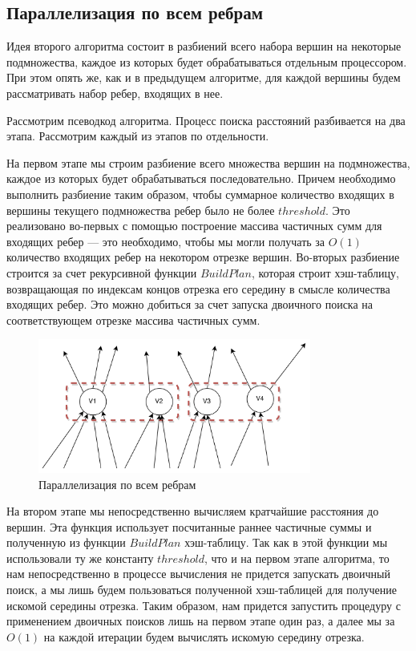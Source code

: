 \FloatBarrier
\subsection{Параллелизация по всем ребрам}
Идея второго алгоритма состоит в разбиений всего набора вершин на некоторые подмножества, каждое из которых будет обрабатываться отдельным процессором. При этом опять же, как и в предыдущем алгоритме, для каждой вершины будем рассматривать набор ребер, входящих в нее. 

Рассмотрим псеводкод алгоритма. Процесс поиска расстояний разбивается на два этапа. Рассмотрим каждый из этапов по отдельности.

На первом этапе мы строим разбиение всего множества вершин на подмножества, каждое из которых будет обрабатываться последовательно. Причем необходимо выполнить разбиение таким образом, чтобы суммарное количество входящих в вершины текущего подмножества ребер было не более $threshold$.  Это реализовано во-первых с помощью построение массива частичных сумм для входящих ребер --- это необходимо, чтобы мы могли получать за $O(1)$ количество входящих ребер на некотором отрезке вершин. Во-вторых разбиение строится за счет рекурсивной функции $BuildPlan$, которая строит хэш-таблицу, возвращающая по индексам концов отрезка его середину в смысле количества входящих ребер. Это можно добиться за счет запуска двоичного поиска на соответствующем отрезке массива частичных сумм. 
\FloatBarrier

\begin{figure}[h]
\caption{Параллелизация по всем ребрам}
\label{bf_par_2_2}
\centering
\includegraphics[width=0.8\textwidth]{img/bf_par_2_2.png}
\end{figure}

На втором этапе мы непосредственно вычисляем кратчайшие расстояния до вершин. Эта функция использует посчитанные раннее частичные суммы и полученную из функции $BuildPlan$ хэш-таблицу. Так как в этой функции мы использовали ту же константу $threshold$, что и на первом этапе алгоритма, то нам непосредственно в процессе вычисления не придется запускать двоичный поиск, а мы лишь будем пользоваться полученной хэш-таблицей для получение искомой середины отрезка. Таким образом, нам придется запустить процедуру с применением двоичных поисков лишь на первом этапе один раз, а далее мы за $O(1)$ на каждой итерации будем вычислять искомую середину отрезка. 

